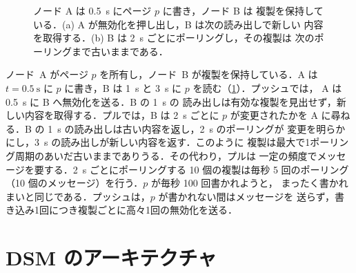 \documentclass[../main.tex]{subfiles}
\begin{document}
\begin{figure}[htbp]
  \centering
  
  \caption{ノード A は \SI{0.5}{\second} にページ $p$ に書き，ノード B は
    複製を保持している．(a) A が無効化を押し出し，B は次の読み出しで新しい
    内容を取得する．(b) B は \SI{2}{\second} ごとにポーリングし，その複製は
    次のポーリングまで古いままである．}
  \label{fig:l15-push-pull}
\end{figure}

\begin{example}
  ノード~A がページ $p$ を所有し，ノード~B が複製を保持している．A は
  $t=\SI{0.5}{\second}$ に $p$ に書き，B は \SI{1}{\second} と
  \SI{3}{\second} に $p$ を読む（\cref{fig:l15-push-pull}）．プッシュでは，
  A は \SI{0.5}{\second} に B へ無効化を送る．B の \SI{1}{\second} の
  読み出しは有効な複製を見出せず，新しい内容を取得する．プルでは，B は
  \SI{2}{\second} ごとに $p$ が変更されたかを A に尋ねる．B の
  \SI{1}{\second} の読み出しは古い内容を返し，\SI{2}{\second} のポーリングが
  変更を明らかにし，\SI{3}{\second} の読み出しが新しい内容を返す．このように
  複製は最大で1ポーリング周期のあいだ古いままでありうる．その代わり，プルは
  一定の頻度でメッセージを要する．\SI{2}{\second} ごとにポーリングする
  10 個の複製は毎秒 5 回のポーリング（10 個のメッセージ）を行う．$p$ が毎秒 100 回書かれようと，
  まったく書かれまいと同じである．プッシュは，$p$ が書かれない間はメッセージを
  送らず，書き込み1回につき複製ごとに高々1回の無効化を送る．
\end{example}

\section{DSM のアーキテクチャ}
\label{sec:l15-architecture}
\end{document}
